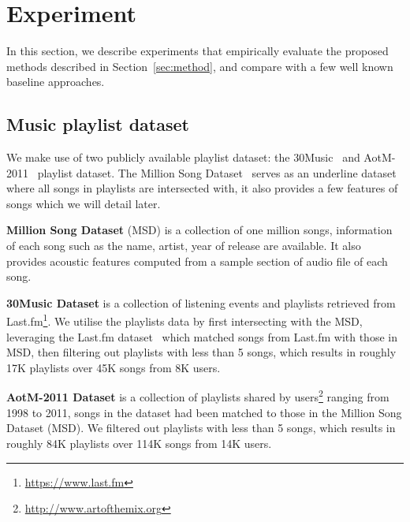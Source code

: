 \section{Experiment}
\label{sec:experiment}

In this section, we describe experiments that empirically evaluate the proposed methods
described in Section~\ref{sec:method}, and compare with a few well known baseline approaches.


\subsection{Music playlist dataset}
We make use of two publicly available playlist dataset: the 30Music~\cite{30music2015} and AotM-2011~\cite{mcfee2012hypergraph} playlist dataset.
The Million Song Dataset~\cite{msd2011} serves as an underline dataset where all songs in playlists are intersected with,
it also provides a few features of songs which we will detail later.

{\bf Million Song Dataset} (MSD) is a collection of one million songs, information of each song such as the name, artist, year of release are available.
It also provides acoustic features computed from a sample section of audio file of each song. %

{\bf 30Music Dataset} is a collection of listening events and playlists retrieved from Last.fm\footnote{\url{https://www.last.fm}}.
We utilise the playlists data by first intersecting with the MSD, leveraging the Last.fm dataset~\cite{lastfmdataset}
which matched songs from Last.fm with those in MSD, then filtering out playlists with less than 5 songs,
which results in roughly 17K playlists over 45K songs from 8K users.

{\bf AotM-2011 Dataset} is a collection of playlists shared by users\footnote{\url{http://www.artofthemix.org}} ranging from 1998 to 2011,
songs in the dataset had been matched to those in the Million Song Dataset (MSD).
We filtered out playlists with less than 5 songs, which results in roughly 84K playlists over 114K songs from 14K users.


